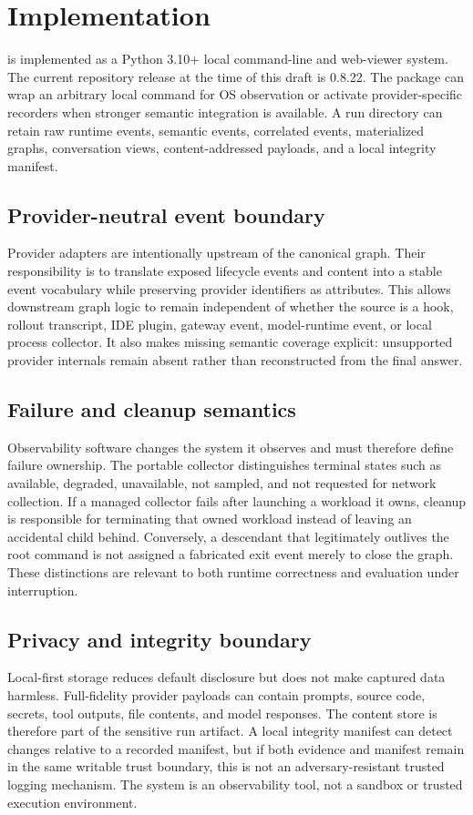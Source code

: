 \section{Implementation}
\system is implemented as a Python 3.10+ local command-line and web-viewer system. The current repository release at the time of this draft is 0.8.22. The package can wrap an arbitrary local command for OS observation or activate provider-specific recorders when stronger semantic integration is available. A run directory can retain raw runtime events, semantic events, correlated events, materialized graphs, conversation views, content-addressed payloads, and a local integrity manifest.

\subsection{Provider-neutral event boundary}
Provider adapters are intentionally upstream of the canonical graph. Their responsibility is to translate exposed lifecycle events and content into a stable event vocabulary while preserving provider identifiers as attributes. This allows downstream graph logic to remain independent of whether the source is a hook, rollout transcript, IDE plugin, gateway event, model-runtime event, or local process collector. It also makes missing semantic coverage explicit: unsupported provider internals remain absent rather than reconstructed from the final answer.

\subsection{Failure and cleanup semantics}
Observability software changes the system it observes and must therefore define failure ownership. The portable collector distinguishes terminal states such as available, degraded, unavailable, not sampled, and not requested for network collection. If a managed collector fails after launching a workload it owns, cleanup is responsible for terminating that owned workload instead of leaving an accidental child behind. Conversely, a descendant that legitimately outlives the root command is not assigned a fabricated exit event merely to close the graph. These distinctions are relevant to both runtime correctness and evaluation under interruption.

\subsection{Privacy and integrity boundary}
Local-first storage reduces default disclosure but does not make captured data harmless. Full-fidelity provider payloads can contain prompts, source code, secrets, tool outputs, file contents, and model responses. The content store is therefore part of the sensitive run artifact. A local integrity manifest can detect changes relative to a recorded manifest, but if both evidence and manifest remain in the same writable trust boundary, this is not an adversary-resistant trusted logging mechanism. The system is an observability tool, not a sandbox or trusted execution environment.

